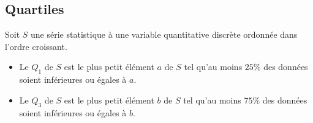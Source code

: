 \documentclass[french,12pt]{report}
\begin{document}
\subsection{Quartiles}
\begin{Defi}[s]{}
    Soit $S$ une série statistique à une variable quantitative discrète ordonnée dans l'ordre croissant.
        \begin{itemize}
            \item Le  $Q_1$ de $S$ est le plus petit élément $a$ de $S$ tel qu'au moins $25\%$ des données soient inférieures ou égales à $a$.
            \item Le  $Q_3$ de $S$ est le plus petit élément $b$ de $S$ tel qu'au moins $75\%$ des données soient inférieures ou égales à $b$.
        \end{itemize}
\end{Defi}


\begin{center}
\end{center}
\end{document}

